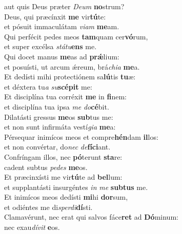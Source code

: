\evenverse aut quis Deus præter \textit{De}\textit{um} \textbf{no}strum?\\
\oddverse Deus, qui præcínxit \textbf{me} vir\textbf{tú}te:~\*\\
\oddverse et pósuit immaculátam \textit{vi}\textit{am} \textbf{me}am.\\
\evenverse Qui perfécit pedes meos \textbf{tam}quam cer\textbf{vó}rum,~\*\\
\evenverse et super excélsa \textit{stá}\textit{tu}\textbf{ens} me.\\
\oddverse Qui docet manus \textbf{me}as ad \textbf{prǽ}lium:~\*\\
\oddverse et posuísti, ut arcum ǽreum, brá\textit{chi}\textit{a} \textbf{me}a.\\
\evenverse Et dedísti mihi protectiónem sa\textbf{lú}tis \textbf{tu}æ:~\*\\
\evenverse et déxtera tu\textit{a} \textit{su}\textbf{scé}\textbf{pit} me:\\
\oddverse Et disciplína tua corréxit \textbf{me} in \textbf{fi}nem:~\*\\
\oddverse et disciplína tua ipsa \textit{me} \textit{do}\textbf{cé}bit.\\
\evenverse Dilatásti gressus \textbf{me}os \textbf{sub}tus me:~\*\\
\evenverse et non sunt infirmáta vestí\textit{gi}\textit{a} \textbf{me}a:\\
\oddverse Pérsequar inimícos meos et compre\textbf{hén}dam \textbf{il}los:~\*\\
\oddverse et non convértar, do\textit{nec} \textit{de}\textbf{fí}\textbf{ci}ant.\\
\evenverse Confríngam illos, nec \textbf{pó}terunt \textbf{sta}re:~\*\\
\evenverse cadent subtus \textit{pe}\textit{des} \textbf{me}os.\\
\oddverse Et præcinxísti me vir\textbf{tú}te ad \textbf{bel}lum:~\*\\
\oddverse et supplantásti insurgéntes \textit{in} \textit{me} \textbf{sub}\textbf{tus} me.\\
\evenverse Et inimícos meos dedísti \textbf{mi}hi \textbf{dor}sum,~\*\\
\evenverse et odiéntes me di\textit{sper}\textit{di}\textbf{dí}sti.\\
\oddverse Clamavérunt, nec erat qui salvos fáce\textbf{ret} ad \textbf{Dó}minum:~\*\\
\oddverse nec exau\textit{dí}\textit{vit} \textbf{e}os.\\
